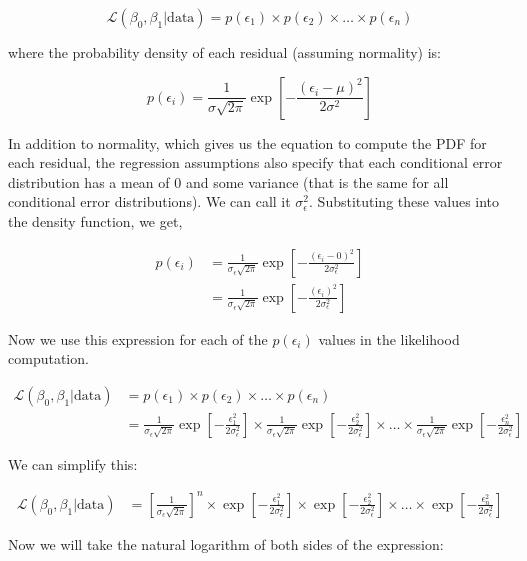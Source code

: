 \documentclass[]{book}
\begin{document}
\[
\mathcal{L}(\beta_0, \beta_1 | \mathrm{data}) = p(\epsilon_1) \times p(\epsilon_2) \times \ldots \times p(\epsilon_n)
\]

where the probability density of each residual (assuming normality) is:

\[
p(\epsilon_i) = \frac{1}{\sigma\sqrt{2\pi}}\exp\left[-\frac{(\epsilon_i-\mu)^2}{2\sigma^2}\right]
\]

In addition to normality, which gives us the equation to compute the PDF for each residual, the regression assumptions also specify that each conditional error distribution has a mean of 0 and some variance (that is the same for all conditional error distributions). We can call it \(\sigma^2_{\epsilon}\). Substituting these values into the density function, we get,

\[
\begin{split}
p(\epsilon_i) &= \frac{1}{\sigma_{\epsilon}\sqrt{2\pi}}\exp\left[-\frac{(\epsilon_i-0)^2}{2\sigma^2_{\epsilon}}\right] \\[1em]
&= \frac{1}{\sigma_{\epsilon}\sqrt{2\pi}}\exp\left[-\frac{(\epsilon_i)^2}{2\sigma^2_{\epsilon}}\right]
\end{split}
\]

Now we use this expression for each of the \(p(\epsilon_i)\) values in the likelihood computation.

\[
\begin{split}
\mathcal{L}(\beta_0, \beta_1 | \mathrm{data}) &= p(\epsilon_1) \times p(\epsilon_2) \times \ldots \times p(\epsilon_n) \\[1em]
&= \frac{1}{\sigma_{\epsilon}\sqrt{2\pi}}\exp\left[-\frac{\epsilon_1
^2}{2\sigma^2_{\epsilon}}\right] \times \frac{1}{\sigma_{\epsilon}\sqrt{2\pi}}\exp\left[-\frac{\epsilon_2^2}{2\sigma^2_{\epsilon}}\right] \times \ldots \times \frac{1}{\sigma_{\epsilon}\sqrt{2\pi}}\exp\left[-\frac{\epsilon_n^2}{2\sigma^2_{\epsilon}}\right] 
\end{split}
\]

We can simplify this:

\[
\begin{split}
\mathcal{L}(\beta_0, \beta_1 | \mathrm{data}) &=\left[ \frac{1}{\sigma_{\epsilon}\sqrt{2\pi}} \right]^n \times \exp\left[-\frac{\epsilon_1^2}{2\sigma^2_{\epsilon}}\right] \times \exp\left[-\frac{\epsilon_2^2}{2\sigma^2_{\epsilon}}\right] \times \ldots \times \exp\left[-\frac{\epsilon_n^2}{2\sigma^2_{\epsilon}}\right] 
\end{split}
\]

Now we will take the natural logarithm of both sides of the expression:
\end{document}
